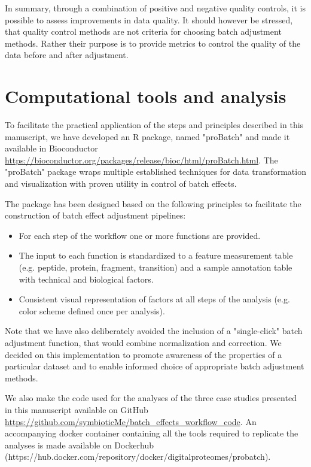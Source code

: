 \documentclass[num-refs]{wiley-article}
\begin{document}
In summary, through a combination of positive and negative quality controls, it is possible to assess improvements in data quality. It should however be stressed, that quality control methods are not criteria for choosing batch adjustment methods. Rather their purpose is to provide metrics to control the quality of the data before and after adjustment.

\section{Computational tools and analysis}

To facilitate the practical application of the steps and principles described in this manuscript, we have developed an R package, named "proBatch" and made it available in Bioconductor \url{https://bioconductor.org/packages/release/bioc/html/proBatch.html}. The "proBatch" package wraps multiple established techniques for data transformation and visualization with proven utility in control of batch effects. 

The package has been designed based on the following principles to facilitate the construction of batch effect adjustment pipelines:
\begin{itemize}
    \item For each step of the workflow one or more functions are provided.
    \item The input to each function is standardized to a feature measurement table (e.g. peptide, protein, fragment, transition) and a sample annotation table with technical and biological factors.
    \item Consistent visual representation of factors at all steps of the analysis (e.g. color scheme defined once per analysis).
\end{itemize}

Note that we have also deliberately avoided the inclusion of a "single-click" batch adjustment function, that would combine normalization and correction. We decided on this implementation to promote awareness of the properties of a particular dataset and to enable informed choice of appropriate batch adjustment methods.

We also make the code used for the analyses of the three case studies presented in this manuscript available on GitHub \url{https://github.com/symbioticMe/batch\_effects\_workflow\_code}. An accompanying docker container containing all the tools required to replicate the analyses is made available on Dockerhub (https://hub.docker.com/repository/docker/digitalproteomes/probatch).
\end{document}
